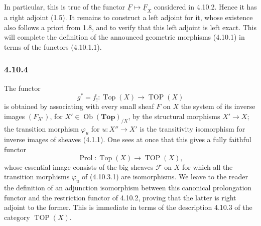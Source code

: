 \documentclass[11pt]{article}
\newcommand{\Esp}{\mathbf{Top}}
\newcommand{\Top}{\operatorname{Top}}
\newcommand{\TOP}{\operatorname{TOP}}
\newcommand{\Ob}{\operatorname{Ob}}
\newcommand{\Prol}{\operatorname{Prol}}
\begin{document}
In particular, this is true of the functor \(\underline F\mapsto\underline F_X\) considered in 4.10.2. Hence it has a right adjoint (1.5). It remains to construct a left adjoint for it, whose existence also follows a priori from 1.8, and to verify that this left adjoint is left exact. This will complete the definition of the announced geometric morphisms (4.10.1) in terms of the functors (4.10.1.1).

\subsubsection*{4.10.4}
The functor
\[
g^\ast=f_!:\Top(X)\longrightarrow\TOP(X)
\]
is obtained by associating with every small sheaf \(F\) on \(X\) the system of its inverse images \((F_{X'})\), for \(X'\in\Ob(\Esp)_{/X}\), by the structural morphisms \(X'\to X\); the transition morphism \(\varphi_u\) for \(u:X''\to X'\) is the transitivity isomorphism for inverse images of sheaves (4.1.1). One sees at once that this gives a fully faithful functor
\[
\Prol:\Top(X)\longrightarrow\TOP(X),
\]
whose essential image consists of the big sheaves \(\mathcal F\) on \(X\) for which all the transition morphisms \(\varphi_u\) of (4.10.3.1) are isomorphisms. We leave to the reader the definition of an adjunction isomorphism between this canonical prolongation functor and the restriction functor of 4.10.2, proving that the latter is right adjoint to the former. This is immediate in terms of the description 4.10.3 of the category \(\TOP(X)\).
\end{document}
